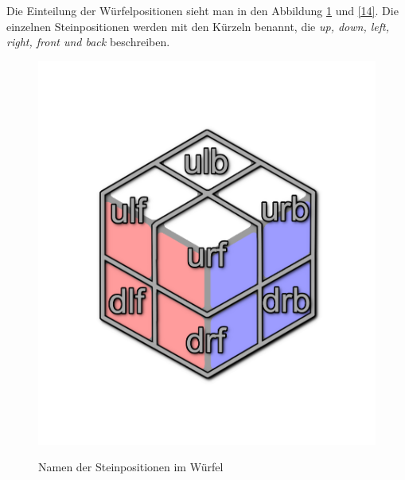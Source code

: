 \documentclass[12pt,a4paper, usenames, dvipsnames]{article}
\theoremstyle{mystyle}
\theoremstyle{definition}
\begin{document}
Die Einteilung der Würfelpositionen sieht man in den Abbildung \ref{13} und \ref{14}. Die einzelnen Steinpositionen werden mit den Kürzeln benannt, die \textit{up, down, left, right, front und back} beschreiben.
\begin{figure}[h]
\centering
\includegraphics[scale=0.15]{caged_positions.png} \\
\caption[Namen der Steinpositionen im Würfel]{Namen der Steinpositionen im Würfel}
\label{13}
\end{figure}
\end{document}
